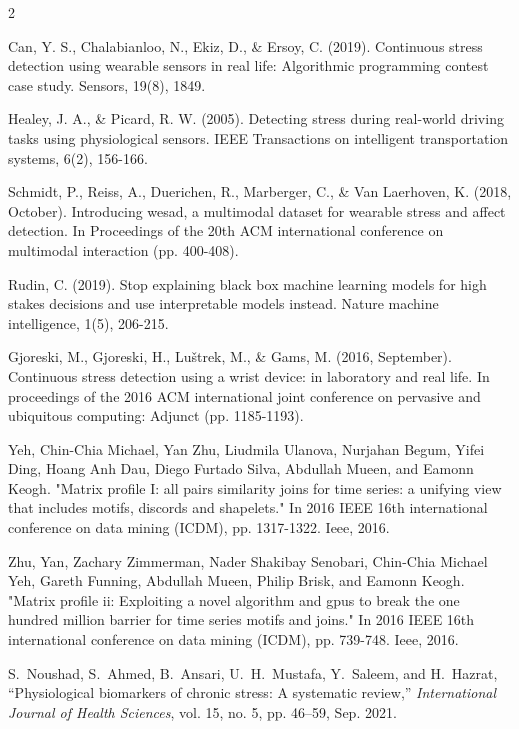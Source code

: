 \documentclass[conference,10pt]{IEEEtran}
\begin{document}
\begin{thebibliography}{2}

 Can, Y. S., Chalabianloo, N., Ekiz, D., \& Ersoy, C. (2019). Continuous stress detection using wearable sensors in real life: Algorithmic programming contest case study. Sensors, 19(8), 1849.

 Healey, J. A., \& Picard, R. W. (2005). Detecting stress during real-world driving tasks using physiological sensors. IEEE Transactions on intelligent transportation systems, 6(2), 156-166.

 Schmidt, P., Reiss, A., Duerichen, R., Marberger, C., \& Van Laerhoven, K. (2018, October). Introducing wesad, a multimodal dataset for wearable stress and affect detection. In Proceedings of the 20th ACM international conference on multimodal interaction (pp. 400-408).

 Rudin, C. (2019). Stop explaining black box machine learning models for high stakes decisions and use interpretable models instead. Nature machine intelligence, 1(5), 206-215.

 Gjoreski, M., Gjoreski, H., Luštrek, M., \& Gams, M. (2016, September). Continuous stress detection using a wrist device: in laboratory and real life. In proceedings of the 2016 ACM international joint conference on pervasive and ubiquitous computing: Adjunct (pp. 1185-1193).

 Yeh, Chin-Chia Michael, Yan Zhu, Liudmila Ulanova, Nurjahan Begum, Yifei Ding, Hoang Anh Dau, Diego Furtado Silva, Abdullah Mueen, and Eamonn Keogh. "Matrix profile I: all pairs similarity joins for time series: a unifying view that includes motifs, discords and shapelets." In 2016 IEEE 16th international conference on data mining (ICDM), pp. 1317-1322. Ieee, 2016.

 Zhu, Yan, Zachary Zimmerman, Nader Shakibay Senobari, Chin-Chia Michael Yeh, Gareth Funning, Abdullah Mueen, Philip Brisk, and Eamonn Keogh. "Matrix profile ii: Exploiting a novel algorithm and gpus to break the one hundred million barrier for time series motifs and joins." In 2016 IEEE 16th international conference on data mining (ICDM), pp. 739-748. Ieee, 2016.

 S.~Noushad, S.~Ahmed, B.~Ansari, U.~H.~Mustafa, Y.~Saleem, and H.~Hazrat, ``Physiological biomarkers of chronic stress: A systematic review,'' \emph{International Journal of Health Sciences}, vol. 15, no. 5, pp. 46--59, Sep. 2021.


\end{thebibliography}
\end{document}
